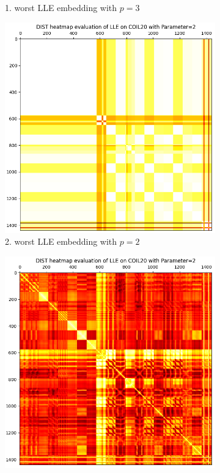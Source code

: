 \begin{figure}[!]
\begin{subfigure}[t]{0.49\columnwidth}
    	\caption{1. worst LLE embedding with $p=3$}
        \label{fig:dist_heatmap_lle_coil20_1worst}
    \end{subfigure}
     \hfill
     \begin{subfigure}[t]{0.49\columnwidth}
    	\centering
    	\includegraphics[width=\columnwidth]{images/dist_heatmap_lle_coil20_2worst_beforediff.png}
    	\caption{2. worst LLE embedding with $p=2$}
        \label{fig:dist_heatmap_lle_coil20_2worst_beforediff}
    \end{subfigure}
     \hfill
     \begin{subfigure}[t]{0.49\columnwidth}
    	\centering
    	\includegraphics[width=\columnwidth]{images/dist_heatmap_lle_coil20_2worst.png}

\end{subfigure}
\end{figure}

